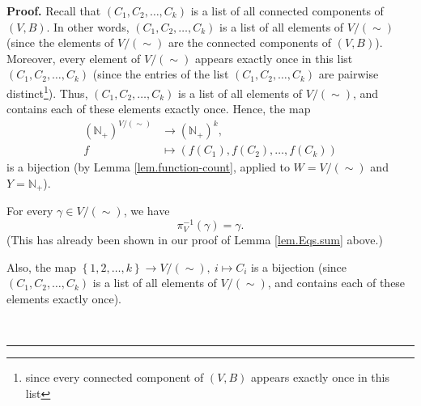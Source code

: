 \documentclass[numbers=enddot,12pt,final,onecolumn,notitlepage]{scrartcl}%
\theoremstyle{definition}
\newenvironment{proof}[1][Proof]{\noindent\textbf{#1.} }{\ \rule{0.5em}{0.5em}}
\newenvironment{verlong}{}{}
\begin{document}
\begin{verlong}
\begin{proof}
Recall that $\left(  C_{1},C_{2},\ldots,C_{k}\right)  $ is a list of all
connected components of $\left(  V,B\right)  $. In other words, $\left(
C_{1},C_{2},\ldots,C_{k}\right)  $ is a list of all elements of $V/\left(
\sim\right)  $ (since the elements of $V/\left(  \sim\right)  $ are the
connected components of $\left(  V,B\right)  $). Moreover, every element of
$V/\left(  \sim\right)  $ appears exactly once in this list $\left(
C_{1},C_{2},\ldots,C_{k}\right)  $ (since the entries of the list $\left(
C_{1},C_{2},\ldots,C_{k}\right)  $ are pairwise distinct\footnote{since every
connected component of $\left(  V,B\right)  $ appears exactly once in this
list}). Thus, $\left(  C_{1},C_{2},\ldots,C_{k}\right)  $ is a list of all
elements of $V/\left(  \sim\right)  $, and contains each of these elements
exactly once. Hence, the map%
\begin{align*}
\left(  \mathbb{N}_{+}\right)  ^{V/\left(  \sim\right)  }  &  \rightarrow
\left(  \mathbb{N}_{+}\right)  ^{k},\\
f  &  \mapsto\left(  f\left(  C_{1}\right)  ,f\left(  C_{2}\right)
,\ldots,f\left(  C_{k}\right)  \right)
\end{align*}
is a bijection (by Lemma \ref{lem.function-count}, applied to $W=V/\left(
\sim\right)  $ and $Y=\mathbb{N}_{+}$).

For every $\gamma\in V/\left(  \sim\right)  $, we have%
\begin{equation}
\pi_{V}^{-1}\left(  \gamma\right)  =\gamma. \label{pf.lem.wEqs.sum.pi-1}%
\end{equation}
(This has already been shown in our proof of Lemma \ref{lem.Eqs.sum} above.)

Also, the map $\left\{  1,2,\ldots,k\right\}  \rightarrow V/\left(
\sim\right)  ,\ i\mapsto C_{i}$ is a bijection (since $\left(  C_{1}%
,C_{2},\ldots,C_{k}\right)  $ is a list of all elements of $V/\left(
\sim\right)  $, and contains each of these elements exactly once).


\end{proof}
\end{verlong}
\end{document}

